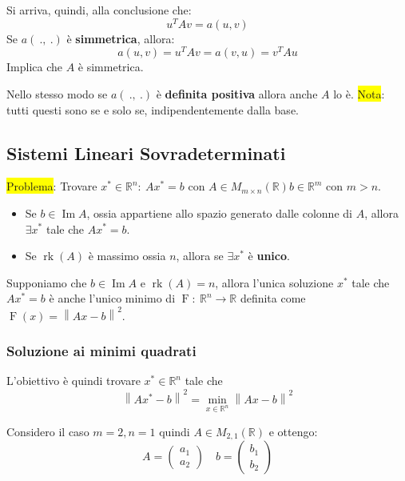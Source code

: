 \documentclass{article}
\begin{document}
Si arriva, quindi, alla conclusione che:\[\boxed{u^TAv=a(u,v)}\]
Se $a(\ .,\ .)$ è \textbf{simmetrica}, allora: \[a(u,v)=u^TAv=a(v,u)=v^TAu\]
Implica che $A$ è simmetrica.

Nello stesso modo se $a(\ .,\ .)$ è \textbf{definita positiva} allora anche $A$ lo è.
\colorbox{yellow}{Nota}: tutti questi sono se e solo se, indipendentemente dalla base.
\newpage
\subsection{Sistemi Lineari Sovradeterminati}
\colorbox{yellow}{Problema}: Trovare $x^\ast\in\mathbb R^n:\ Ax^\ast=b$ con $A\in M_{m\times n}(\mathbb R) b\in\mathbb R^m$ con $\boxed{m>n}$.
\begin{itemize}
    \item Se $b\in \operatorname{Im} A$, ossia appartiene allo spazio generato dalle colonne di $A$, allora $\exists x^\ast$ tale che $Ax^\ast=b$.
    \item Se $\operatorname{rk}(A)$ è massimo ossia $n$, allora se $\exists x^\ast$ è \textbf{unico}.
\end{itemize}
Supponiamo che $b\in \operatorname{Im} A$ e $\operatorname{rk}(A)=n$, allora l'unica soluzione $x^\ast$ tale che $Ax^\ast=b$ è anche l'unico minimo di
$\operatorname{F}:\ \mathbb R^n\to\mathbb R$ definita come $\operatorname{F}(x)=\left\|Ax-b\right\|^2$.

\subsubsection{Soluzione ai minimi quadrati}
L'obiettivo è quindi trovare $x^\ast\in\mathbb R^n$ tale che \[\left\|Ax^\ast-b\right\|^2=\min_{x\in\mathbb R^n}\left\|Ax-b\right\|^2\]

\begin{ex}{Considero il caso}{}
    $m=2,n=1$ quindi $A\in M_{2,1}(\mathbb R)$ e ottengo:
    \[A=\begin{pmatrix}
            a_1 \\a_2
        \end{pmatrix}
        \quad b=\begin{pmatrix}
            b_1 \\b_2
        \end{pmatrix}
    \]
\end{ex}
\end{document}
